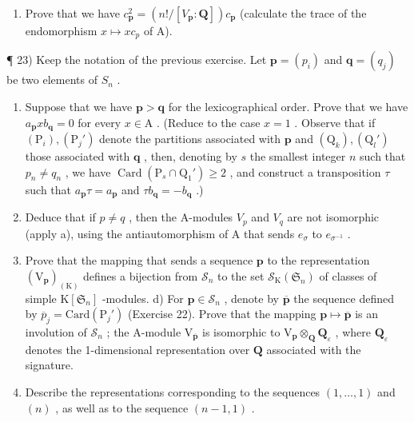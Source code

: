 \begin{enumerate}
\def\labelenumi{\alph{enumi})}
\setcounter{enumi}{4}
\tightlist
\item
  Prove that we have \(c_{\mathbf{p}}^{2} = (n!/[V_{\mathbf{p}} : \mathbf{Q}]) c_{\mathbf{p}}\) (calculate the trace of the endomorphism \(x \mapsto xc_{p}\) of A).
\end{enumerate}

¶ 23) Keep the notation of the previous exercise. Let \(\mathbf{p} = (p_i)\) and \(\mathbf{q} = (q_j)\) be two elements of \(S_n\) .

\begin{enumerate}
\def\labelenumi{\alph{enumi})}
\item
  Suppose that we have \(\mathbf{p} > \mathbf{q}\) for the lexicographical order. Prove that we have \(a_{\mathbf{p}}xb_{\mathbf{q}} = 0\) for every \(x \in \mathrm{A}\) . (Reduce to the case \(x = 1\) . Observe that if \((\mathrm{P}_i), (\mathrm{P}_j')\) denote the partitions associated with \(\mathbf{p}\) and \((\mathrm{Q}_k), (\mathrm{Q}_l')\) those associated with \(\mathbf{q}\) , then, denoting by \(s\) the smallest integer \(n\) such that \(p_n \neq q_n\) , we have \(\operatorname{Card}(\mathrm{P}_s \cap \mathrm{Q}_1') \geqslant 2\) , and construct a transposition \(\tau\) such that \(a_{\mathbf{p}}\tau = a_{\mathbf{p}}\) and \(\tau b_{\mathbf{q}} = -b_{\mathbf{q}}\) .)
\item
  Deduce that if \(p \neq q\) , then the A-modules \(V_{p}\) and \(V_{q}\) are not isomorphic (apply a), using the antiautomorphism of A that sends \(e_{\sigma}\) to \(e_{\sigma^{-1}}\) .
\item
  Prove that the mapping that sends a sequence \(\mathbf{p}\) to the representation \((\mathrm{V}_{\mathbf{p}})_{(\mathrm{K})}\) defines a bijection from \(\mathcal{S}_n\) to the set \(\mathcal{S}_{\mathrm{K}}(\mathfrak{S}_n)\) of classes of simple \(\mathrm{K}[\mathfrak{S}_n]\) -modules. d) For \(\mathbf{p} \in \mathcal{S}_n\) , denote by \(\overline{\mathbf{p}}\) the sequence defined by \(\overline{p}_j = \mathrm{Card}(\mathrm{P}_j')\) (Exercise 22). Prove that the mapping \(\mathbf{p} \mapsto \overline{\mathbf{p}}\) is an involution of \(\mathcal{S}_n\) ; the A-module \(\mathrm{V}_{\overline{\mathbf{p}}}\) is isomorphic to \(\mathrm{V}_{\mathbf{p}} \otimes_{\mathbf{Q}} \mathbf{Q}_{\varepsilon}\) , where \(\mathbf{Q}_{\varepsilon}\) denotes the 1-dimensional representation over \(\mathbf{Q}\) associated with the signature.
\item
  Describe the representations corresponding to the sequences \((1, \ldots, 1)\) and \((n)\) , as well as to the sequence \((n - 1, 1)\) .
\end{enumerate}


